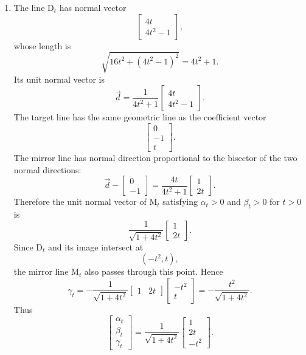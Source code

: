 \documentclass[10pt,a4paper]{article}
\begin{document}
\begin{enumerate}
  \item The line D$_t$ has normal vector
        \[
          \begin{bmatrix}
            4t\\4t^2-1
          \end{bmatrix},
        \]
        whose length is
        \[
          \sqrt{16t^2+(4t^2-1)^2}=4t^2+1.
        \]
        Its unit normal vector is
        \[
          \vec{d}=
          \frac{1}{4t^2+1}
          \begin{bmatrix}
            4t\\4t^2-1
          \end{bmatrix}.
        \]
        The target line has the same geometric line as the coefficient vector
        \[
          \begin{bmatrix}
            0\\-1\\t
          \end{bmatrix}.
        \]
        The mirror line has normal direction proportional to the bisector of the two normal directions:
        \[
          \vec{d}-
          \begin{bmatrix}
            0\\-1
          \end{bmatrix}
          =
          \frac{4t}{4t^2+1}
          \begin{bmatrix}
            1\\2t
          \end{bmatrix}.
        \]
        Therefore the unit normal vector of M$_t$ satisfying $\alpha_t>0$ and $\beta_t>0$ for $t>0$ is
        \[
          \frac{1}{\sqrt{1+4t^2}}
          \begin{bmatrix}
            1\\2t
          \end{bmatrix}.
        \]
        Since D$_t$ and its image intersect at
        \[
          (-t^2,t),
        \]
        the mirror line M$_t$ also passes through this point. Hence
        \[
          \gamma_t
          =
          -\frac{1}{\sqrt{1+4t^2}}
          \begin{bmatrix}
            1&2t
          \end{bmatrix}
          \begin{bmatrix}
            -t^2\\t
          \end{bmatrix}
          =
          -\frac{t^2}{\sqrt{1+4t^2}}.
        \]
        Thus
        \[
          \boxed{
          \begin{bmatrix}
            \alpha_t\\\beta_t\\\gamma_t
          \end{bmatrix}
          =
          \frac{1}{\sqrt{1+4t^2}}
          \begin{bmatrix}
            1\\2t\\-t^2
          \end{bmatrix}}.
        \]


\end{enumerate}
\end{document}
